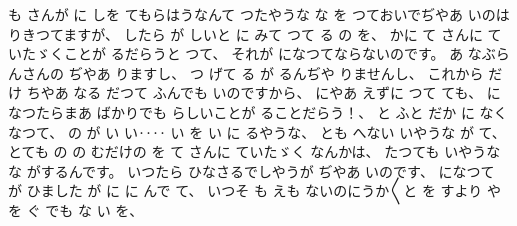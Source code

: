 %
も
さんが
に
しを
てもらはうなんて
つたやうな
な
を
つておいでぢやあ
いのは
りきつてますが、
%
したら
が
しいと
に
みて
つて
る
の
を、
%
かに
て
さんに
ていたゞくことが
るだらうと
つて、
%
それが
になつてならないのです。
%
あ
なぶらんさんの
ぢやあ
りますし、
%
つ
げて
る
が
るんぢや
りませんし、
%
これから
だけ
ちやあ
なる
だつて
ふんでも
いのですから、
%
にやあ
えずに
つて
ても、
%
になつたらまあ
ばかりでも
らしいことが
ることだらう！、
%
と
ふと
だか
に
なくなつて、
%
の
が
い
い‥‥
い
を
い
に
るやうな、
%
とも
へない
いやうな
が
て、
%
とても
の
の
むだけの
を
て
さんに
ていたゞく
なんかは、
%
たつても
いやうな
な
がするんです。
%
いつたら
ひなさるでしやうが
ぢやあ
いのです、
%
になつて
が
ひました
が
に
に
んで
て、
%
いつそ
も
えも
ないのにうか〳〵と
を
すより
や
を
ぐ
でも
な
い
を、
